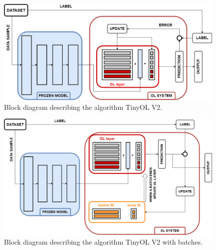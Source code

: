 \documentclass[12pt]{report}
\begin{document}
\begin{figure}[h!]
    \centering
    \includegraphics[width=120mm]{Figures/Chapter3/OLV2.png} 
    \caption{Block diagram describing the algorithm TinyOL V2.}
    \label{fig:block_diag_OLV2}    
\end{figure}

\begin{figure}[h!]
    \centering
    \includegraphics[width=120mm]{Figures/Chapter3/OLv2wb.png} 
    \caption{Block diagram describing the algorithm TinyOL V2 with batches.}
    \label{fig:block_diag_OLV2wb}    
\end{figure}
\end{document}
